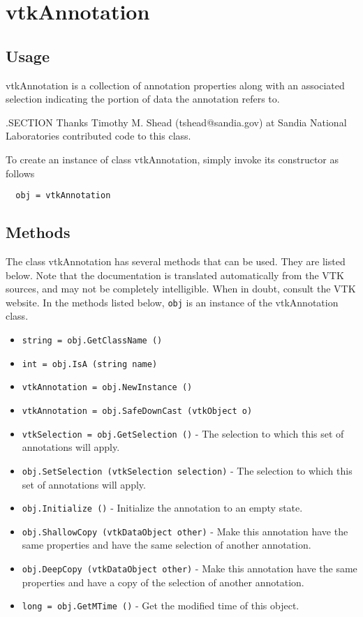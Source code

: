 \section{vtkAnnotation}

\subsection{Usage}

 vtkAnnotation is a collection of annotation properties along with
 an associated selection indicating the portion of data the annotation
 refers to.

 .SECTION Thanks
 Timothy M. Shead (tshead@sandia.gov) at Sandia National Laboratories
 contributed code to this class.

To create an instance of class vtkAnnotation, simply
invoke its constructor as follows
\begin{verbatim}
  obj = vtkAnnotation
\end{verbatim}
\subsection{Methods}

The class vtkAnnotation has several methods that can be used.
  They are listed below.
Note that the documentation is translated automatically from the VTK sources,
and may not be completely intelligible.  When in doubt, consult the VTK website.
In the methods listed below, \verb|obj| is an instance of the vtkAnnotation class.
\begin{itemize}
\item  \verb|string = obj.GetClassName ()|

\item  \verb|int = obj.IsA (string name)|

\item  \verb|vtkAnnotation = obj.NewInstance ()|

\item  \verb|vtkAnnotation = obj.SafeDownCast (vtkObject o)|

\item  \verb|vtkSelection = obj.GetSelection ()| -  The selection to which this set of annotations will apply.

\item  \verb|obj.SetSelection (vtkSelection selection)| -  The selection to which this set of annotations will apply.

\item  \verb|obj.Initialize ()| -  Initialize the annotation to an empty state.

\item  \verb|obj.ShallowCopy (vtkDataObject other)| -  Make this annotation have the same properties and have
 the same selection of another annotation.

\item  \verb|obj.DeepCopy (vtkDataObject other)| -  Make this annotation have the same properties and have
 a copy of the selection of another annotation.

\item  \verb|long = obj.GetMTime ()| -  Get the modified time of this object.

\end{itemize}
